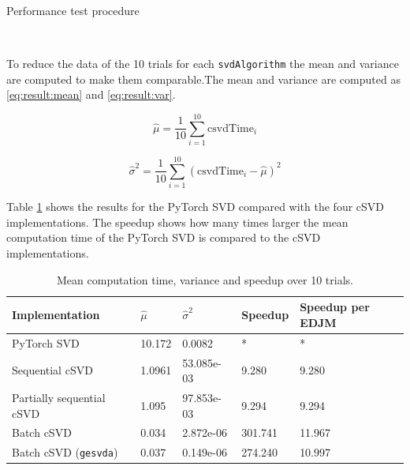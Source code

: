 \begin{algorithm}[H]
\label{alg:result:performance}
\caption{Performance test procedure}
\end{algorithm}

$ $ \newline

To reduce the data of the 10 trials for each \texttt{svdAlgorithm} the mean and variance are computed to make them comparable.The mean and variance are computed as \eqref{eq:result:mean} and \eqref{eq:result:var}.

\begin{equation}
  \label{eq:result:mean}
  \hat \mu = \frac{1}{10} \sum_{i=1}^{10} \mathrm{csvdTime}_i 
\end{equation}

\begin{equation}
  \label{eq:result:var}
  \hat \sigma^2 = \frac{1}{10} \sum_{i=1}^{10} \left ( \mathrm{csvdTime}_i - \hat \mu \right )^2
\end{equation}

Table \ref{tab:csvd:performance} shows the results for the PyTorch SVD compared with the four cSVD implementations. The speedup shows how many times larger the mean computation time of the PyTorch SVD is compared to the cSVD implementations.

\begin{table}[H]
  \centering
    \begin{tabular}{|l|l|l|l|l|} \hline
      Implementation & $\hat \mu$ & $\hat \sigma^2$ & Speedup & Speedup per EDJM \\ \hline
      PyTorch SVD & 10.172 & 0.0082 & * & * \\ \hline
      Sequential cSVD & 1.0961  & 53.085e-03 & 9.280 & 9.280 \\ \hline
      Partially sequential cSVD & 1.095 & 97.853e-03 & 9.294 & 9.294 \\ \hline
      Batch cSVD & 0.034 & 2.872e-06 & 301.741 & 11.967 \\ \hline
      Batch cSVD (\texttt{gesvda}) & 0.037  & 0.149e-06 & 274.240 & 10.997 \\ \hline
    \end{tabular}
    \caption{Mean computation time, variance and speedup over 10 trials.}
    \label{tab:csvd:performance}
\end{table}

